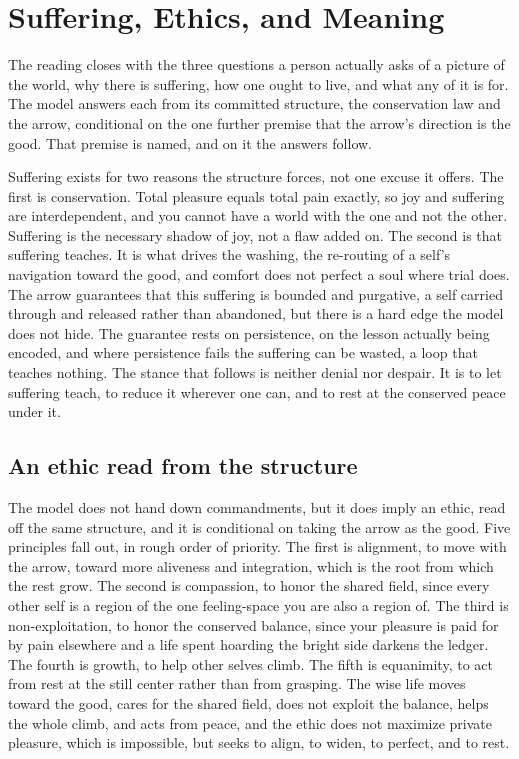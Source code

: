 \section{Suffering, Ethics, and Meaning}

The reading closes with the three questions a person actually asks of a picture of the world, why there is suffering, how one ought to live, and what any of it is for. The model answers each from its committed structure, the conservation law and the arrow, conditional on the one further premise that the arrow's direction is the good. That premise is named, and on it the answers follow.

Suffering exists for two reasons the structure forces, not one excuse it offers. The first is conservation. Total pleasure equals total pain exactly, so joy and suffering are interdependent, and you cannot have a world with the one and not the other. Suffering is the necessary shadow of joy, not a flaw added on. The second is that suffering teaches. It is what drives the washing, the re-routing of a self's navigation toward the good, and comfort does not perfect a soul where trial does. The arrow guarantees that this suffering is bounded and purgative, a self carried through and released rather than abandoned, but there is a hard edge the model does not hide. The guarantee rests on persistence, on the lesson actually being encoded, and where persistence fails the suffering can be wasted, a loop that teaches nothing. The stance that follows is neither denial nor despair. It is to let suffering teach, to reduce it wherever one can, and to rest at the conserved peace under it.

\subsection{An ethic read from the structure}

The model does not hand down commandments, but it does imply an ethic, read off the same structure, and it is conditional on taking the arrow as the good. Five principles fall out, in rough order of priority. The first is alignment, to move with the arrow, toward more aliveness and integration, which is the root from which the rest grow. The second is compassion, to honor the shared field, since every other self is a region of the one feeling-space you are also a region of. The third is non-exploitation, to honor the conserved balance, since your pleasure is paid for by pain elsewhere and a life spent hoarding the bright side darkens the ledger. The fourth is growth, to help other selves climb. The fifth is equanimity, to act from rest at the still center rather than from grasping. The wise life moves toward the good, cares for the shared field, does not exploit the balance, helps the whole climb, and acts from peace, and the ethic does not maximize private pleasure, which is impossible, but seeks to align, to widen, to perfect, and to rest.

